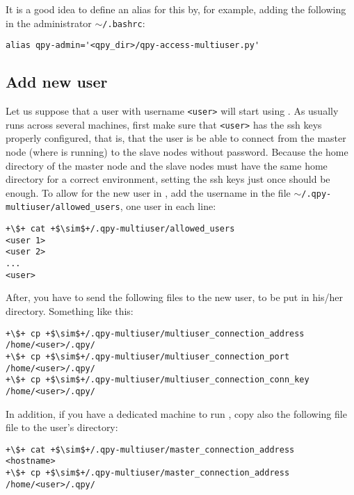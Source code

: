 \documentclass[a4paper,12pt]{article}
\begin{document}
It is a good idea to define an alias for this by, for example, adding the following in the \qpy{} administrator \texttt{$\sim$/.bashrc}:

\begin{lstlisting}[style=FileStyle]
  alias qpy-admin='<qpy_dir>/qpy-access-multiuser.py'
\end{lstlisting}


\subsection{Add new user}

Let us suppose that a user with username \texttt{<user>} will start using \qpy{}.
As \qpy{} usually runs across several machines, first make sure that \texttt{<user>} has the ssh keys properly configured, that is, that the user is be able to connect from the master node (where \qpy{} is running) to the slave nodes without password.
Because the home directory of the master node and the slave nodes must have the same home directory for a correct \qpy{} environment, setting the ssh keys just once should be enough.
To allow for the new user in \qpy{}, add the username in the file \texttt{$\sim$/.qpy-multiuser/allowed\_users}, one user in each line:

\begin{lstlisting}[style=BashStyle]
+\$+ cat +$\sim$+/.qpy-multiuser/allowed_users
<user 1>
<user 2>
...
<user>
\end{lstlisting}

After, you have to send the following files to the new user, to be put in his/her \qpy{} directory.
Something like this:

\begin{lstlisting}[style=BashStyle]
+\$+ cp +$\sim$+/.qpy-multiuser/multiuser_connection_address /home/<user>/.qpy/
+\$+ cp +$\sim$+/.qpy-multiuser/multiuser_connection_port /home/<user>/.qpy/
+\$+ cp +$\sim$+/.qpy-multiuser/multiuser_connection_conn_key /home/<user>/.qpy/
\end{lstlisting}

In addition, if you have a dedicated machine to run \qpy{}, copy also the following file file to the user's \qpy{} directory:

\begin{lstlisting}[style=BashStyle]
+\$+ cat +$\sim$+/.qpy-multiuser/master_connection_address
<hostname>
+\$+ cp +$\sim$+/.qpy-multiuser/master_connection_address /home/<user>/.qpy/
\end{lstlisting}
\end{document}
